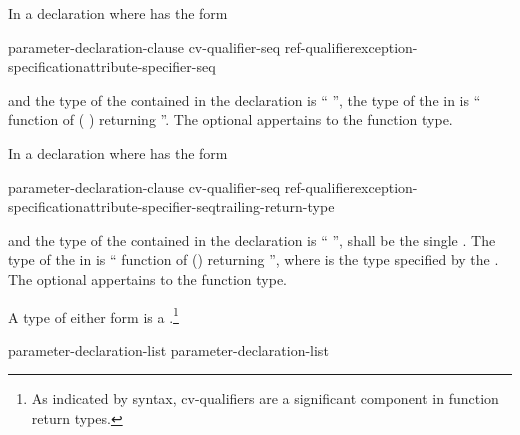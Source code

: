 \pnum
{}%
In a declaration
where
has the form

\begin{ncsimplebnf}
 parameter-declaration-clause \terminal{)} cv-qualifier-seq\opt\br
\hspace*{\bnfindentinc}ref-qualifier\opt exception-specification\opt attribute-specifier-seq\opt
\end{ncsimplebnf}

and the type of the contained
in the declaration
is
``
'',
the type of the
in
is `` function of
( )
  returning
''.
The optional  appertains to the function type.

\pnum
In a declaration
where
has the form

\begin{ncsimplebnf}
 parameter-declaration-clause \terminal{)} cv-qualifier-seq\opt\br
\hspace*{\bnfindentinc}ref-qualifier\opt exception-specification\opt attribute-specifier-seq\opt trailing-return-type
\end{ncsimplebnf}

and the type of the contained  in the declaration 
 is `` '',  shall
be the single  . The type of the
 in  is
`` function of
() \opt
{}\opt returning '', where 
is the type specified by the . The
optional  appertains to the function type.

\pnum
{}%
A type of either form is a .\footnote{As indicated by syntax, cv-qualifiers are a significant component in function return types.}

%
\begin{bnf}
\br
parameter-declaration-list\opt {}\opt\br
    parameter-declaration-list 
\end{bnf}

